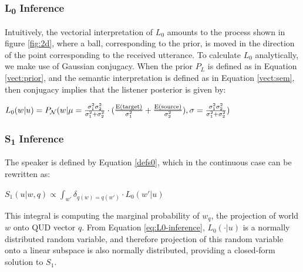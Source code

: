 \documentclass[OpenMind]{stjour}
\begin{document}
\subsubsection{L\textsubscript{0} Inference}


	Intuitively, the vectorial interpretation of $L_0$ amounts to the process shown in figure \ref{fig:2d}, where a ball, corresponding to the prior, is moved in the direction of the point corresponding to the received utterance. To calculate $L_0$ analytically, we make use of Gaussian conjugacy. When the prior $P_L$ is defined as in Equation \ref{vect:prior}, and the semantic interpretation is defined as in Equation \ref{vect:sem}, then conjugacy implies that the listener posterior is given by:

	 \begin{exe}
	\ex $L_0(w|u) = P_{\mathcal{N}}(w\vert\mu=\frac{\sigma_1^2 \sigma_2^2}{\sigma_1^2+\sigma_2^2}\cdot(\frac{{\textrm{\emph{E(target)}}}}{\sigma_1^2}+\frac{{\textrm{\emph{E(source)}}}}{\sigma_2^2}), \sigma=\frac{\sigma_1^2 \sigma_2^2}{\sigma_1^2+\sigma_2^2})$  \label{eq:L0-inference}
	 \end{exe}
















\subsubsection{S\textsubscript{1} Inference}
		The speaker is defined by Equation \ref{defs0}, which in the continuous case can be rewritten as:
		\begin{exe}
		\ex $S_1(u\vert w,q) \propto \int_{w'} \delta_{q(w)=q(w')} \cdot L_0(w'\vert u)$
		\end{exe}
		This integral is computing the marginal probability of $w_q$, the projection of world $w$ onto QUD vector $q$. From Equation \ref{eq:L0-inference}, $L_0(\cdot \vert u)$ is a normally distributed random variable, and therefore projection of this random variable onto a linear subspace is also normally distributed, providing a closed-form solution to $S_1$.
\end{document}
